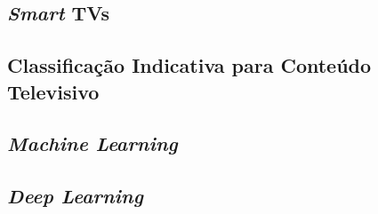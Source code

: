 
\subsection{\emph{Smart} TVs}


\subsection{Classificação Indicativa para Conteúdo Televisivo}


\subsection{\emph{Machine Learning}}


\subsection{\emph{Deep Learning}}

